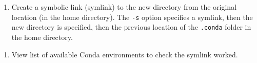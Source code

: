 \documentclass[
]{book}
\newenvironment{Shaded}{\begin{snugshade}}{\end{snugshade}}
\newcommand{\ErrorTok}[1]{\textcolor[rgb]{0.64,0.00,0.00}{\textbf{#1}}}
\newcommand{\NormalTok}[1]{#1}
\newcommand{\OperatorTok}[1]{\textcolor[rgb]{0.81,0.36,0.00}{\textbf{#1}}}
\newcommand{\StringTok}[1]{\textcolor[rgb]{0.31,0.60,0.02}{#1}}
\providecommand{\tightlist}{%
  \setlength{\itemsep}{0pt}\setlength{\parskip}{0pt}}
\begin{document}
\begin{Shaded}
\end{Shaded}

\begin{enumerate}
\def\labelenumi{\arabic{enumi}.}
\setcounter{enumi}{5}
\tightlist
\item
  Create a symbolic link (symlink) to the new directory from the original location (in the home directory). The \texttt{-s} option specifies a symlink, then the new directory is specified, then the previous location of the \texttt{.conda} folder in the home directory.
\end{enumerate}

\begin{Shaded}
\end{Shaded}

\begin{enumerate}
\def\labelenumi{\arabic{enumi}.}
\setcounter{enumi}{6}
\tightlist
\item
  View list of available Conda environments to check the symlink worked.
\end{enumerate}

\begin{Shaded}
\end{Shaded}
\end{document}
